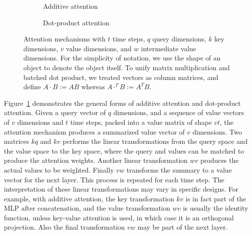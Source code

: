 \documentclass[11pt]{article}
\DeclareMathOperator{\softmax}{softmax}
\begin{document}
\begin{figure}
  \begin{subfigure}{0.5\textwidth}
    \centering
    \caption*{Additive attention}
  \end{subfigure}%
  \begin{subfigure}{0.5\textwidth}
    \centering
    \caption*{Dot-product attention}
  \end{subfigure}
  \caption[]{\label{fig:attention}Attention mechanisms with
    \(t\) time steps, \(q\) query dimensions, \(k\) key dimensions,
    \(v\) value dimensions, and \(w\) intermediate value dimensions.
    For the simplicity of notation,
    we use the shape of an object to denote the object itself.
    To unify matrix multiplication and batched dot product,
    we treated vectors as column matrices,
    and define \(A \cdot B := A B\)
    whereas \(A \cdot^{T} B := A^{T} B\).}
\end{figure}

Figure~\ref{fig:attention} demonstrates the general forms of additive attention and dot-product attention.
Given a query vector of \(q\) dimensions,
and a sequence of value vectors of \(v\) dimensions and \(t\) time steps,
packed into a value matrix of shape \(vt\),
the attention mechanism produces a summarized value vector of \(v\) dimensions.
Two matrices \(kq\) and \(kv\) performs the linear transformations
from the query space and the value space to the key space,
where the query and values can be matched to produce the attention weights.
Another linear transformation \(wv\) produces the actual values to be weighted.
Finally \(vw\) transforms the summary to a value vector for the next layer.
This process is repeated for each time step.
The interpretation of these linear transformations may vary in specific designs.
For example, with additive attention,
the key transformation \(kv\) is in fact part of the MLP after concatenation,
and the value transformation \(wv\) is usually the identity function,
unless key-value attention is used, in which case it is an orthogonal projection.
Also the final transformation \(vw\) may be part of the next layer.
\end{document}

